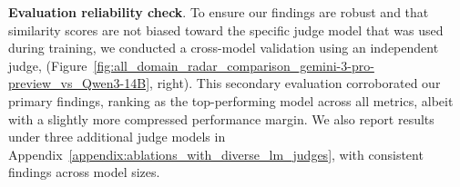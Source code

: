 
\textbf{Evaluation reliability check}. 
To ensure our findings are robust and that similarity scores are not biased toward the specific judge model that was used during training, we conducted a cross-model validation using an independent judge, \qwenfourteenb{} (Figure~\ref{fig:all_domain_radar_comparison_gemini-3-pro-preview_vs_Qwen3-14B}, right). This secondary evaluation corroborated our primary findings, ranking \ourmethod{} as the top-performing model across all metrics, albeit with a slightly more compressed performance margin. We also report results under three additional judge models in Appendix~\ref{appendix:ablations_with_diverse_lm_judges}, with consistent findings across model sizes.






